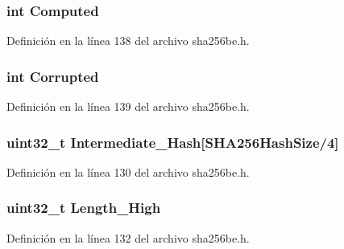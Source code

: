 \subsubsection[{Computed}]{\setlength{\rightskip}{0pt plus 5cm}int Computed}\label{struct_s_h_a256_context_aeb5a7a168bb512db53299543094702aa}


Definición en la línea 138 del archivo sha256be.\+h.

\hypertarget{struct_s_h_a256_context_a4bc60740c300c7929a676f997d9484a9}{}
\subsubsection[{Corrupted}]{\setlength{\rightskip}{0pt plus 5cm}int Corrupted}\label{struct_s_h_a256_context_a4bc60740c300c7929a676f997d9484a9}


Definición en la línea 139 del archivo sha256be.\+h.

\hypertarget{struct_s_h_a256_context_a5d9aeb28e3a5c2f444066c1c9685ac91}{}
\subsubsection[{Intermediate\+\_\+\+Hash}]{\setlength{\rightskip}{0pt plus 5cm}uint32\+\_\+t Intermediate\+\_\+\+Hash\mbox{[}{\bf S\+H\+A256\+Hash\+Size}/4\mbox{]}}\label{struct_s_h_a256_context_a5d9aeb28e3a5c2f444066c1c9685ac91}


Definición en la línea 130 del archivo sha256be.\+h.

\hypertarget{struct_s_h_a256_context_a73f82f23d8acae6d67b249511811d654}{}
\subsubsection[{Length\+\_\+\+High}]{\setlength{\rightskip}{0pt plus 5cm}uint32\+\_\+t Length\+\_\+\+High}\label{struct_s_h_a256_context_a73f82f23d8acae6d67b249511811d654}


Definición en la línea 132 del archivo sha256be.\+h.

